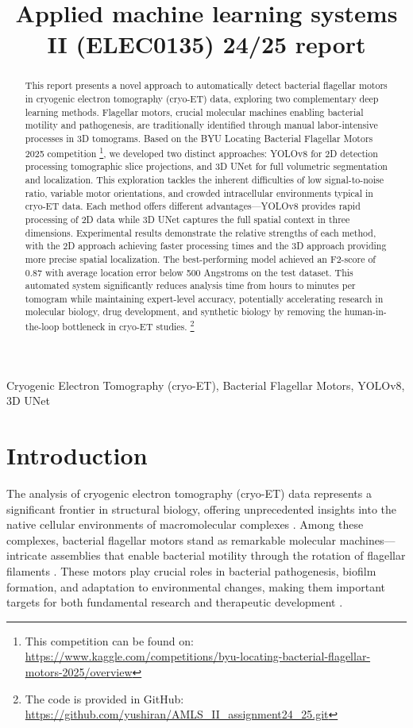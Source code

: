\documentclass{article}
\title{Applied machine learning systems II (ELEC0135) 24/25 report}
\begin{document}
%
\maketitle
%
\begin{abstract}
    \label{sec:abs}
    This report presents a novel approach to automatically detect bacterial flagellar motors in cryogenic electron tomography (cryo-ET) data, exploring two complementary deep learning methods. 
    Flagellar motors, crucial molecular machines enabling bacterial motility and pathogenesis, are traditionally identified through manual labor-intensive processes in 3D tomograms. 
    Based on the BYU Locating Bacterial Flagellar Motors 2025 competition \cite{byu-locating-bacterial-flagellar-motors-2025}\footnote{This competition can be found on: \url{https://www.kaggle.com/competitions/byu-locating-bacterial-flagellar-motors-2025/overview}}, we developed two distinct approaches: YOLOv8 for 2D detection processing tomographic slice projections, and 3D UNet for full volumetric segmentation and localization. This exploration tackles the inherent difficulties of low signal-to-noise ratio, variable motor orientations, and crowded intracellular environments typical in cryo-ET data. 
    Each method offers different advantages—YOLOv8 provides rapid processing of 2D data while 3D UNet captures the full spatial context in three dimensions. Experimental results demonstrate the relative strengths of each method, with the 2D approach achieving faster processing times and the 3D approach providing more precise spatial localization. The best-performing model achieved an F2-score of 0.87 with average location error below 500 Angstroms on the test dataset.
    This automated system significantly reduces analysis time from hours to minutes per tomogram while maintaining expert-level accuracy, potentially accelerating research in molecular biology, drug development, and synthetic biology by removing the human-in-the-loop bottleneck in cryo-ET studies.
    \footnote{The code is provided in GitHub: \url{https://github.com/yushiran/AMLS_II_assignment24_25.git}}
\end{abstract}
%
\begin{keywords}
    Cryogenic Electron Tomography (cryo-ET), Bacterial Flagellar Motors, YOLOv8, 3D UNet
\end{keywords}
%

\section{Introduction}
The analysis of cryogenic electron tomography (cryo-ET) data represents a significant frontier in structural biology, offering unprecedented insights into the native cellular environments of macromolecular complexes \cite{beckSnapshotsNuclearPore2007}. Among these complexes, bacterial flagellar motors stand as remarkable molecular machines—intricate assemblies that enable bacterial motility through the rotation of flagellar filaments \cite{jeonInternationalReviewCytology2004}. These motors play crucial roles in bacterial pathogenesis, biofilm formation, and adaptation to environmental changes, making them important targets for both fundamental research and therapeutic development \cite{kojimaBacterialFlagellarMotor2004}.
\end{document}
